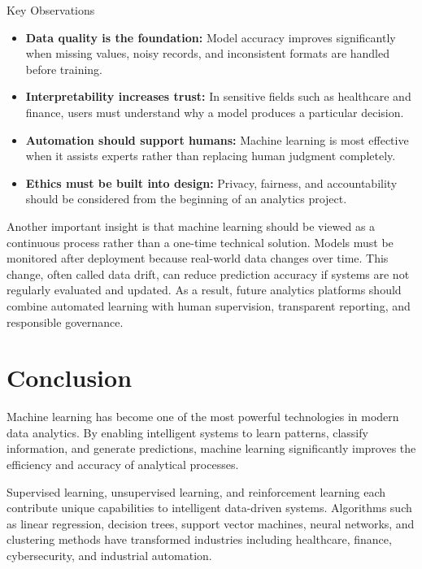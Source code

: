 \documentclass[11pt,a4paper]{article}
\begin{document}
\begin{summarybox}{Key Observations}
\begin{itemize}
    \item \textbf{Data quality is the foundation:} Model accuracy improves significantly when missing values, noisy records, and inconsistent formats are handled before training.
    \item \textbf{Interpretability increases trust:} In sensitive fields such as healthcare and finance, users must understand why a model produces a particular decision.
    \item \textbf{Automation should support humans:} Machine learning is most effective when it assists experts rather than replacing human judgment completely.
    \item \textbf{Ethics must be built into design:} Privacy, fairness, and accountability should be considered from the beginning of an analytics project.
\end{itemize}
\end{summarybox}

Another important insight is that machine learning should be viewed as a continuous process rather than a one-time technical solution. Models must be monitored after deployment because real-world data changes over time. This change, often called data drift, can reduce prediction accuracy if systems are not regularly evaluated and updated. As a result, future analytics platforms should combine automated learning with human supervision, transparent reporting, and responsible governance.


\section{Conclusion}

Machine learning has become one of the most powerful technologies in modern data analytics. By enabling intelligent systems to learn patterns, classify information, and generate predictions, machine learning significantly improves the efficiency and accuracy of analytical processes.

Supervised learning, unsupervised learning, and reinforcement learning each contribute unique capabilities to intelligent data-driven systems. Algorithms such as linear regression, decision trees, support vector machines, neural networks, and clustering methods have transformed industries including healthcare, finance, cybersecurity, and industrial automation.
\end{document}
